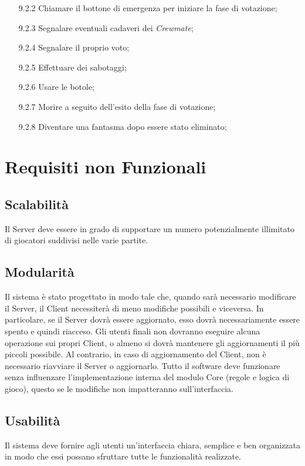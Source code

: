 \begin{enumerate}
\begin{enumerate}
\begin{enumerate}
\item[9.2.2] Chiamare il bottone di emergenza per iniziare la fase di votazione;
\item[9.2.3] Segnalare eventuali cadaveri dei \textit{Crewmate};
\item[9.2.4] Segnalare il proprio voto;
\item[9.2.5] Effettuare dei sabotaggi;
\item[9.2.6] Usare le botole;
\item[9.2.7] Morire a seguito dell'esito della fase di votazione;
\item[9.2.8] Diventare una fantasma dopo essere stato eliminato;
\end{enumerate}
\end{enumerate}
\end{enumerate}

\section{Requisiti non Funzionali}
\subsection{Scalabilit\`a}
Il Server deve essere in grado di supportare un numero potenzialmente illimitato di giocatori suddivisi nelle varie partite.
\subsection{Modularit\`a}
Il sistema \`e stato progettato in modo tale che, quando sar\`a necessario modificare il Server, il Client necessiter\`a di meno modifiche possibili e viceversa. In particolare, se il Server dovr\`a essere aggiornato, esso dovr\`a necessariamente essere spento e quindi riacceso. Gli utenti finali non dovranno eseguire alcuna operazione sui propri Client, o almeno si dovr\`a mantenere gli aggiornamenti il più piccoli possibile. Al contrario, in caso di aggiornamento del Client, non è necessario riavviare il Server o aggiornarlo. Tutto il software deve funzionare senza influenzare l'implementazione interna del modulo Core (regole e logica di gioco), questo se le modifiche non impatteranno sull'interfaccia.
\subsection{Usabilit\`a}
Il sistema deve fornire agli utenti un'interfaccia chiara, semplice e ben organizzata in modo che essi possano sfruttare tutte le funzionalità realizzate.
